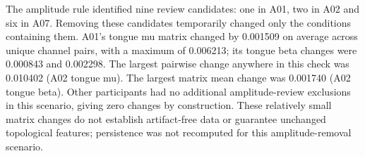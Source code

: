 The amplitude rule identified nine review candidates: one in A01, two in A02 and six in A07. Removing these candidates temporarily changed only the conditions containing them. A01's tongue mu matrix changed by 0.001509 on average across unique channel pairs, with a maximum of 0.006213; its tongue beta changes were 0.000843 and 0.002298. The largest pairwise change anywhere in this check was 0.010402 (A02 tongue mu). The largest matrix mean change was 0.001740 (A02 tongue beta). Other participants had no additional amplitude-review exclusions in this scenario, giving zero changes by construction. These relatively small matrix changes do not establish artifact-free data or guarantee unchanged topological features; persistence was not recomputed for this amplitude-removal scenario.
